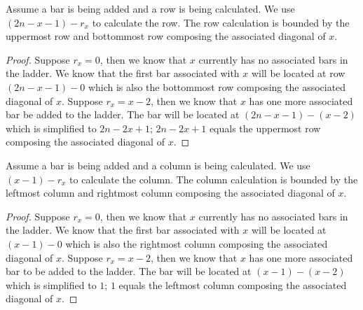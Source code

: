 
\begin{lemma}
  Assume a bar is being added and a row is being calculated. 
  We use $(2n - x - 1) - r_{x}$ to calculate the row. The row calculation is bounded by the uppermost row and bottommost row composing the associated diagonal of $x$. 
  \label{Lemma:Case1}
\end{lemma}
\begin{proof}
   Suppose $r_{x}=0$, then we know that $x$ currently has no associated bars in the ladder. 
   We know that the first bar associated with $x$ will 
   be located at row $(2n-x-1)-0$ which is also the bottommost row composing the associated diagonal of $x$.  
   Suppose $r_{x}=x-2$, then we know that $x$ has one more associated bar be added to the ladder. The bar will be located at 
   $(2n - x - 1) - (x-2)$ which is simplified to $2n-2x+1$; $2n-2x+1$ equals the uppermost row composing the associated diagonal of $x$.  
\end{proof}

\begin{lemma}
  Assume a bar is being added and a column is being calculated. 
  We use $(x-1)-r_{x}$ to calculate the column. The column calculation is bounded by the leftmost column and rightmost column 
  composing the associated diagonal of $x$. 
  \label{Lemma:Case2}
\end{lemma}
\begin{proof}
  Suppose $r_{x}=0$, then we know that $x$ currently has no associated bars in the ladder. 
  We know that the first bar associated with $x$ will be located at $(x-1)-0$ which is also the rightmost column composing the associated 
  diagonal of $x$. Suppose $r_{x} = x-2$, then we know that $x$ has one more associated bar to be added to the ladder. The bar will 
  be located at $(x-1)-(x-2)$ which is simplified to $1$; $1$ equals the leftmost column composing the associated diagonal of $x$.

\end{proof}

